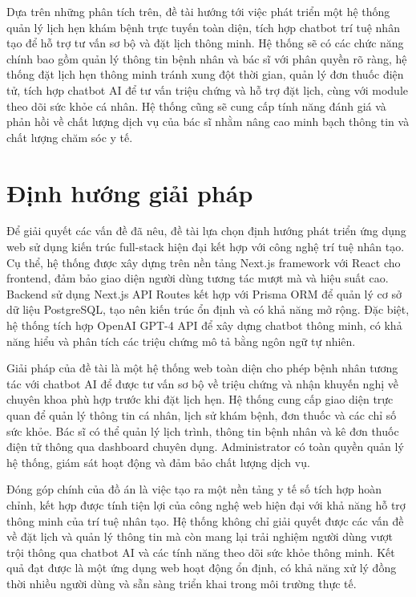 \documentclass[../DoAn.tex]{subfiles}
\begin{document}
Dựa trên những phân tích trên, đề tài hướng tới việc phát triển một hệ thống quản lý lịch hẹn khám bệnh trực tuyến toàn diện, tích hợp chatbot trí tuệ nhân tạo để hỗ trợ tư vấn sơ bộ và đặt lịch thông minh. Hệ thống sẽ có các chức năng chính bao gồm quản lý thông tin bệnh nhân và bác sĩ với phân quyền rõ ràng, hệ thống đặt lịch hẹn thông minh tránh xung đột thời gian, quản lý đơn thuốc điện tử, tích hợp chatbot AI để tư vấn triệu chứng và hỗ trợ đặt lịch, cùng với module theo dõi sức khỏe cá nhân. Hệ thống cũng sẽ cung cấp tính năng đánh giá và phản hồi về chất lượng dịch vụ của bác sĩ nhằm nâng cao minh bạch thông tin và chất lượng chăm sóc y tế.

\section{Định hướng giải pháp}
\label{section:1.3}

Để giải quyết các vấn đề đã nêu, đề tài lựa chọn định hướng phát triển ứng dụng web sử dụng kiến trúc full-stack hiện đại kết hợp với công nghệ trí tuệ nhân tạo. Cụ thể, hệ thống được xây dựng trên nền tảng Next.js framework với React cho frontend, đảm bảo giao diện người dùng tương tác mượt mà và hiệu suất cao. Backend sử dụng Next.js API Routes kết hợp với Prisma ORM để quản lý cơ sở dữ liệu PostgreSQL, tạo nên kiến trúc ổn định và có khả năng mở rộng. Đặc biệt, hệ thống tích hợp OpenAI GPT-4 API để xây dựng chatbot thông minh, có khả năng hiểu và phân tích các triệu chứng mô tả bằng ngôn ngữ tự nhiên.

Giải pháp của đề tài là một hệ thống web toàn diện cho phép bệnh nhân tương tác với chatbot AI để được tư vấn sơ bộ về triệu chứng và nhận khuyến nghị về chuyên khoa phù hợp trước khi đặt lịch hẹn. Hệ thống cung cấp giao diện trực quan để quản lý thông tin cá nhân, lịch sử khám bệnh, đơn thuốc và các chỉ số sức khỏe. Bác sĩ có thể quản lý lịch trình, thông tin bệnh nhân và kê đơn thuốc điện tử thông qua dashboard chuyên dụng. Administrator có toàn quyền quản lý hệ thống, giám sát hoạt động và đảm bảo chất lượng dịch vụ.

Đóng góp chính của đồ án là việc tạo ra một nền tảng y tế số tích hợp hoàn chỉnh, kết hợp được tính tiện lợi của công nghệ web hiện đại với khả năng hỗ trợ thông minh của trí tuệ nhân tạo. Hệ thống không chỉ giải quyết được các vấn đề về đặt lịch và quản lý thông tin mà còn mang lại trải nghiệm người dùng vượt trội thông qua chatbot AI và các tính năng theo dõi sức khỏe thông minh. Kết quả đạt được là một ứng dụng web hoạt động ổn định, có khả năng xử lý đồng thời nhiều người dùng và sẵn sàng triển khai trong môi trường thực tế.
\end{document}
